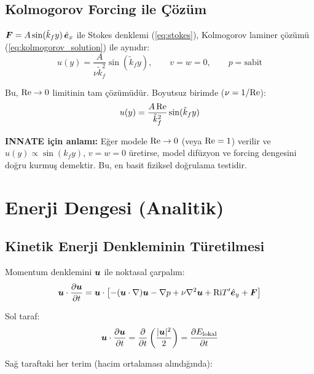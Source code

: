 \subsection{Kolmogorov Forcing ile Çözüm}

$\bm{F} = A \sin(\tilde{k}_f y) \, \hat{\bm{e}}_x$ ile Stokes denklemi (\ref{eq:stokes}), Kolmogorov laminer çözümü (\ref{eq:kolmogorov_solution}) ile aynıdır:
\begin{equation}
    u(y) = \frac{A}{\nu \tilde{k}_f^2} \sin(\tilde{k}_f y), \qquad v = w = 0, \qquad p = \text{sabit}
\end{equation}

Bu, $\mathrm{Re} \to 0$ limitinin tam çözümüdür. Boyutsuz birimde ($\nu = 1/\mathrm{Re}$):
\begin{equation}
    u(y) = \frac{A \, \mathrm{Re}}{\tilde{k}_f^2} \sin(\tilde{k}_f y)
\end{equation}

\textbf{INNATE için anlamı:} Eğer modele $\mathrm{Re} \to 0$ (veya $\mathrm{Re} = 1$) verilir ve $u(y) \propto \sin(k_f y)$, $v = w = 0$ üretirse, model difüzyon ve forcing dengesini doğru kurmuş demektir. Bu, en basit fiziksel doğrulama testidir.


\section{Enerji Dengesi (Analitik)}
\label{sec:energy_balance_analytic}

\subsection{Kinetik Enerji Denkleminin Türetilmesi}

Momentum denklemini $\bm{u}$ ile noktasal çarpalım:
\begin{equation}
    \bm{u} \cdot \frac{\partial \bm{u}}{\partial t} = \bm{u} \cdot \left[ -(\bm{u} \cdot \nabla)\bm{u} - \nabla p + \nu \nabla^2 \bm{u} + \mathrm{Ri} T' \hat{\bm{e}}_y + \bm{F} \right]
\end{equation}

Sol taraf:
\begin{equation}
    \bm{u} \cdot \frac{\partial \bm{u}}{\partial t} = \frac{\partial }{\partial t} \left( \frac{|\bm{u}|^2}{2} \right) = \frac{\partial E_{\text{lokal}}}{\partial t}
\end{equation}

Sağ taraftaki her terim (hacim ortalaması alındığında):

